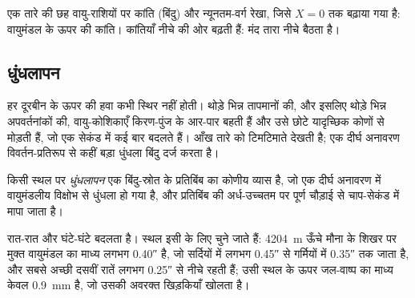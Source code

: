 \begin{omfigure}

{\small एक तारे की छह वायु-राशियों पर कांति (बिंदु) और न्यूनतम-वर्ग रेखा, जिसे $X = 0$ तक
बढ़ाया गया है: वायुमंडल के ऊपर की कांति। कांतियाँ नीचे की ओर बढ़ती हैं: मंद तारा नीचे बैठता है।}
\end{omfigure}

\subsection*{धुंधलापन}

हर दूरबीन के ऊपर की हवा कभी स्थिर नहीं होती। थोड़े भिन्न तापमानों की, और इसलिए थोड़े भिन्न
अपवर्तनांकों की, वायु-कोशिकाएँ किरण-पुंज के आर-पार बहती हैं और उसे छोटे यादृच्छिक कोणों से
मोड़ती हैं, जो एक सेकंड में कई बार बदलते हैं। आँख तारे को टिमटिमाते देखती है; एक दीर्घ
अनावरण विवर्तन-प्रतिरूप से कहीं बड़ा धुंधला बिंदु दर्ज करता है।

\begin{definition}[धुंधलापन]\label{def:b1:observing-the-sky:seeing}
किसी स्थल पर \emph{धुंधलापन} एक बिंदु-स्रोत के प्रतिबिंब का कोणीय व्यास है, जो एक
दीर्घ अनावरण में वायुमंडलीय विक्षोभ से धुंधला हो गया है, और प्रतिबिंब की अर्ध-उच्चतम पर पूर्ण
चौड़ाई से चाप-सेकंड में मापा जाता है।
\end{definition}

 रात-रात और घंटे-घंटे बदलता है। स्थल इसी के लिए चुने जाते हैं: \qty{4204}{m} ऊँचे मौना के शिखर पर मुक्त वायुमंडल का माध्य  लगभग \ang{;;0.40} है, जो सर्दियों में लगभग
\ang{;;0.45} से गर्मियों में \ang{;;0.35} तक जाता है, और सबसे अच्छी दसवीं रातें लगभग
\ang{;;0.25} से नीचे रहती हैं; उसी स्थल के ऊपर जल-वाष्प का माध्य केवल \qty{0.9}{mm} है, जो उसकी
अवरक्त खिड़कियाँ खोलता है।

